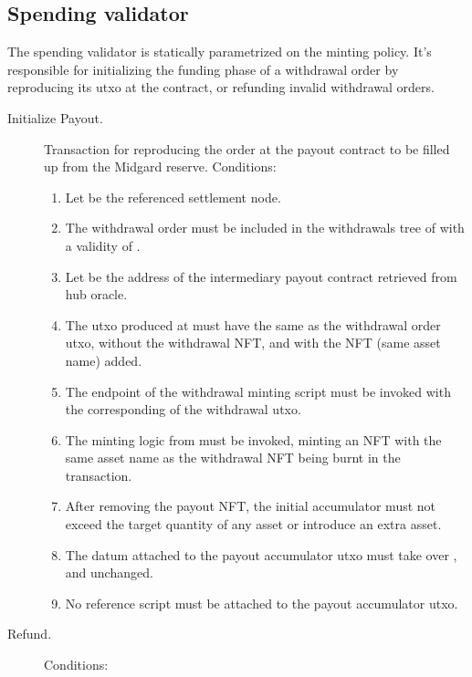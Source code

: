 \documentclass[../midgard.tex]{subfiles}
\begin{document}
\subsection{Spending validator}
\label{h:withdrawal-order-spending-validator}

The  spending validator is statically parametrized on the  minting policy.
It's responsible for initializing the funding phase of a withdrawal order by reproducing its utxo at the  contract, or refunding invalid withdrawal orders.

\begin{description}
  \item[Initialize Payout.] Transaction for reproducing the order at the payout contract to be filled up from the Midgard reserve.
    Conditions:
    \begin{enumerate}
      \item Let  be the referenced settlement node.
      \item The withdrawal order must be included in the withdrawals tree of  with a validity of .
      \item Let  be the address of the intermediary payout contract retrieved from hub oracle.
      \item The utxo produced at  must have the same  as the withdrawal order utxo, without the withdrawal NFT, and with the  NFT (same asset name) added.
      \item The  endpoint of the withdrawal minting script must be invoked with the corresponding  of the withdrawal utxo.
      \item The minting logic from  must be invoked, minting an NFT with the same asset name as the withdrawal NFT being burnt in the transaction.
      \item After removing the payout NFT, the initial accumulator must not exceed the target quantity of any asset or introduce an extra asset.
      \item The datum attached to the payout accumulator utxo must take over ,  and  unchanged.
      \item No reference script must be attached to the payout accumulator utxo.
    \end{enumerate}
  \item[Refund.] 
    Conditions:

\end{description}
\end{document}
